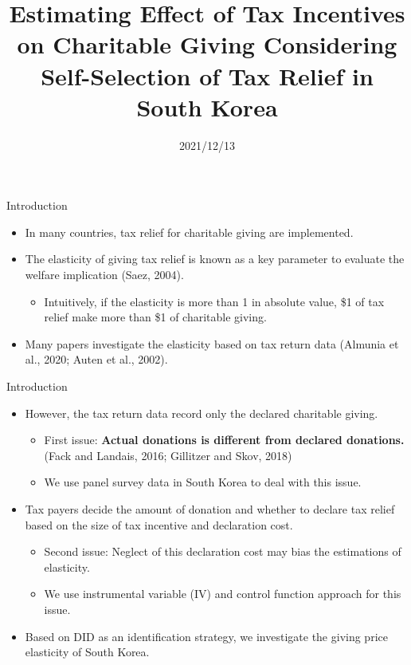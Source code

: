 \documentclass[
  ignorenonframetext,
  aspectratio=169,
]{beamer}
\title{Estimating Effect of Tax Incentives on Charitable Giving Considering Self-Selection of Tax Relief in South Korea  }
\author[shortname]{ Hiroki Kato \inst{1} \and  Tsuyoshi Goto \inst{2} \and  Yong-Rok Kim \inst{3} \and }
\institute[shortinst]{ \inst{1} Osaka University \and  \inst{2} Chiba University \and  \inst{3} Kansai University \and }
\date{2021/12/13}
\providecommand{\tightlist}{%
  \setlength{\itemsep}{0pt}\setlength{\parskip}{0pt}}
\begin{document}
\frame{\titlepage}

\begin{frame}{Introduction}
\protect\hypertarget{introduction}{}
\begin{itemize}
\tightlist
\item
  In many countries, tax relief for charitable giving are implemented.
\item
  The elasticity of giving tax relief is known as a key parameter to evaluate the welfare implication (Saez, 2004).

  \begin{itemize}
  \tightlist
  \item
    Intuitively, if the elasticity is more than 1 in absolute value, \$1 of tax relief make more than \$1 of charitable giving.
  \end{itemize}
\item
  Many papers investigate the elasticity based on tax return data (Almunia et al., 2020; Auten et al., 2002).
\end{itemize}
\end{frame}

\begin{frame}{Introduction}
\protect\hypertarget{introduction-1}{}
\begin{itemize}
\tightlist
\item
  However, the tax return data record only the declared charitable giving.

  \begin{itemize}
  \tightlist
  \item
    First issue: \textbf{Actual donations is different from declared donations.} (Fack and Landais, 2016; Gillitzer and Skov, 2018)
  \item
    We use panel survey data in South Korea to deal with this issue.
  \end{itemize}
\item
  Tax payers decide the amount of donation and whether to declare tax relief based on the size of tax incentive and declaration cost.

  \begin{itemize}
  \tightlist
  \item
    Second issue: Neglect of this declaration cost may bias the estimations of elasticity.
  \item
    We use instrumental variable (IV) and control function approach for this issue.
  \end{itemize}
\item
  Based on DID as an identification strategy, we investigate the giving price elasticity of South Korea.
\end{itemize}
\end{frame}
\end{document}
